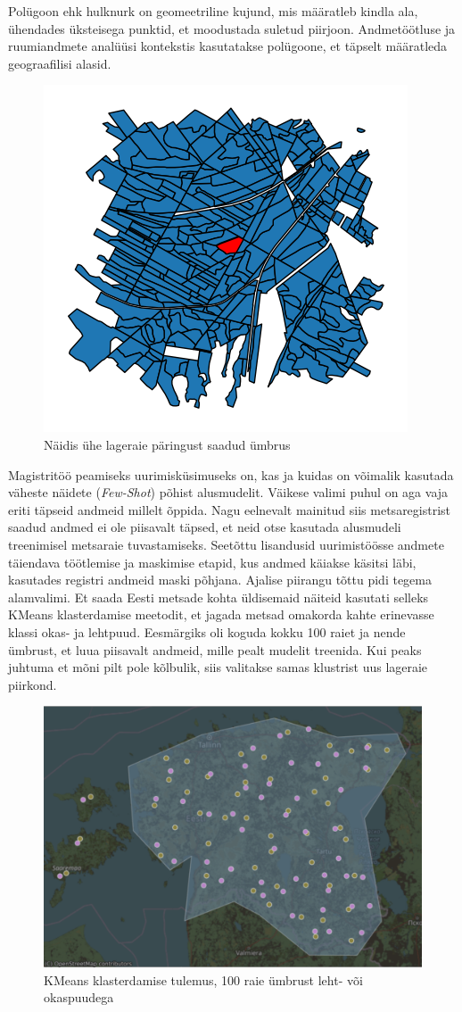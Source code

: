 Polügoon ehk hulknurk on geomeetriline kujund, mis määratleb kindla ala, ühendades üksteisega
punktid, et moodustada suletud piirjoon. Andmetöötluse ja ruumiandmete analüüsi
kontekstis kasutatakse polügoone, et täpselt määratleda geograafilisi alasid. \cite{WhatLocationPolygon}

\begin{figure}[H]
    \centering
    \includegraphics[width=.5\textwidth]{figures/andmestik/er_id_is10124223.png}
    \caption{Näidis ühe lageraie päringust saadud ümbrus}
    \label{fig:umbrusexample}
\end{figure}

Magistritöö peamiseks uurimisküsimuseks on, kas ja kuidas on võimalik kasutada väheste näidete (\textit{Few-Shot}) põhist alusmudelit. Väikese valimi puhul on aga vaja eriti täpseid andmeid millelt õppida. Nagu eelnevalt mainitud siis metsaregistrist saadud andmed ei ole piisavalt täpsed, et neid otse kasutada alusmudeli treenimisel metsaraie tuvastamiseks. Seetõttu lisandusid uurimistöösse andmete täiendava töötlemise ja maskimise etapid, kus andmed käiakse käsitsi läbi, kasutades registri andmeid maski põhjana. Ajalise piirangu tõttu pidi tegema alamvalimi. Et saada Eesti metsade kohta üldisemaid näiteid kasutati selleks KMeans klasterdamise meetodit, et jagada metsad omakorda kahte erinevasse klassi okas- ja lehtpuud. Eesmärgiks oli koguda kokku 100 raiet ja nende ümbrust, et luua piisavalt andmeid, mille pealt mudelit treenida. Kui peaks juhtuma et mõni pilt pole kõlbulik, siis valitakse samas klustrist uus lageraie piirkond.

\begin{figure}[H]
    \centering
    \includegraphics[width=.9\textwidth]{figures/andmestik/kmeansmap.png}
    \caption{KMeans klasterdamise tulemus, 100 raie ümbrust leht- või okaspuudega}
    \label{fig:kmeans}
\end{figure}


